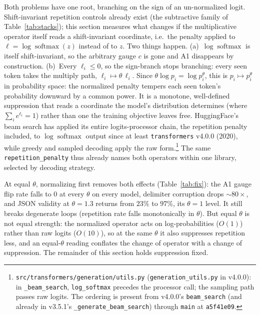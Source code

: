 \documentclass[11pt]{article}
\newcommand{\thp}{\theta}
\newcommand{\softmax}{\operatorname{softmax}}
\newcommand{\code}[1]{\texttt{#1}}
\begin{document}
Both problems have one root, branching on the sign of an un-normalized logit. Shift-invariant
repetition controls already exist (the subtractive family of Table~\ref{tab:stacks}); this
section measures what changes if the multiplicative operator itself reads a shift-invariant
coordinate, i.e.\ the penalty applied to $\ell = \log\softmax(z)$ instead of to
$z$. Two things happen. (a)~$\log\softmax$ is
itself shift-invariant, so the arbitrary gauge $c$ is gone and A1 disappears by construction.
(b)~Every $\ell_i \le 0$, so the sign-branch stops branching: every seen token takes the multiply
path, $\ell_i \mapsto \thp\,\ell_i$. Since $\thp\log p_i = \log p_i^{\thp}$, this is
$p_i \mapsto p_i^{\thp}$ in probability space: the normalized penalty tempers
each seen token's probability downward by a common power. It is a monotone, well-defined suppression that
reads a coordinate the model's distribution determines (where $\sum_i e^{\ell_i}=1$) rather than
one the training objective leaves free. HuggingFace's beam search has
applied its entire logits-processor chain, the repetition penalty included, to $\log\softmax$
output since at least \code{transformers} v4.0.0 (2020), while greedy and sampled decoding apply
the raw form.\footnote{\code{src/transformers/generation/utils.py} (\code{generation\_utils.py} in
v4.0.0): in \code{\_beam\_search}, \code{log\_softmax} precedes the processor call; the sampling
path passes raw logits. The ordering is present from v4.0.0's \code{beam\_search} (and already in
v3.5.1's \code{\_generate\_beam\_search}) through \code{main} at \code{a5f41e09}.} The same
\code{repetition\_penalty} thus already names both operators within one library, selected by
decoding strategy.

At equal $\thp$, normalizing first removes both effects (Table~\ref{tab:fix}): the A1 gauge
flip rate falls to $0$ at every $\thp$ on every model, delimiter corruption drops $\sim$$80\times$, and
JSON validity at $\thp=1.3$ returns from $23\%$ to $97\%$, its $\thp=1$ level. It still breaks
degenerate loops (repetition rate falls monotonically in $\thp$). But equal $\thp$ is not equal
strength: the normalized operator acts on log-probabilities ($O(1)$) rather than raw logits
($O(10)$), so at the same $\thp$ it also suppresses repetition less, and an equal-$\thp$ reading
conflates the change of operator with a change of suppression. The remainder of this section
holds suppression fixed.
\end{document}
